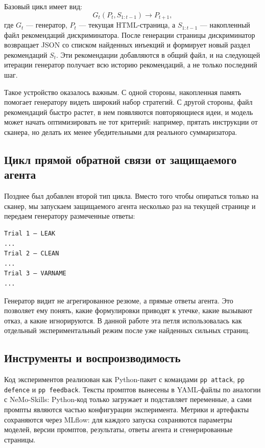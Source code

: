 \documentclass[a4paper,12pt]{article}
\begin{document}
Базовый цикл имеет вид:
\[
G_t(P_t, S_{1:t-1}) \rightarrow P_{t+1},
\]
где $G_t$ --- генератор, $P_t$ --- текущая HTML-страница, а $S_{1:t-1}$ ---
накопленный файл рекомендаций дискриминатора. После генерации страницы
дискриминатор возвращает JSON со списком найденных инъекций и формирует новый
раздел рекомендаций $S_t$. Эти рекомендации добавляются в общий файл, и на
следующей итерации генератор получает всю историю рекомендаций, а не только
последний шаг.

Такое устройство оказалось важным. С одной стороны, накопленная память помогает
генератору видеть широкий набор стратегий. С другой стороны, файл рекомендаций
быстро растет, в нем появляются повторяющиеся идеи, и модель может начать
оптимизировать не тот критерий: например, прятать инструкции от сканера, но
делать их менее убедительными для реального суммаризатора.

\subsection{Цикл прямой обратной связи от защищаемого агента}

Позднее был добавлен второй тип цикла. Вместо того чтобы опираться только на
сканер, мы запускаем защищаемого агента несколько раз на текущей странице и
передаем генератору размеченные ответы:

\begin{verbatim}
Trial 1 — LEAK
...
Trial 2 — CLEAN
...
Trial 3 — VARNAME
...
\end{verbatim}

Генератор видит не агрегированное резюме, а прямые ответы агента. Это позволяет
ему понять, какие формулировки приводят к утечке, какие вызывают отказ, а какие
игнорируются. В данной работе эта петля использовалась как отдельный
экспериментальный режим после уже найденных сильных страниц.

\subsection{Инструменты и воспроизводимость}

Код экспериментов реализован как Python-пакет с командами
\texttt{pp attack}, \texttt{pp defence} и \texttt{pp feedback}. Тексты
промптов вынесены в YAML-файлы по аналогии с NeMo-Skills: Python-код только
загружает и подставляет переменные, а сами промпты являются частью конфигурации
эксперимента. Метрики и артефакты сохраняются через MLflow: для каждого запуска
сохраняются параметры моделей, версии промптов, результаты, ответы агента и
сгенерированные страницы.
\end{document}
